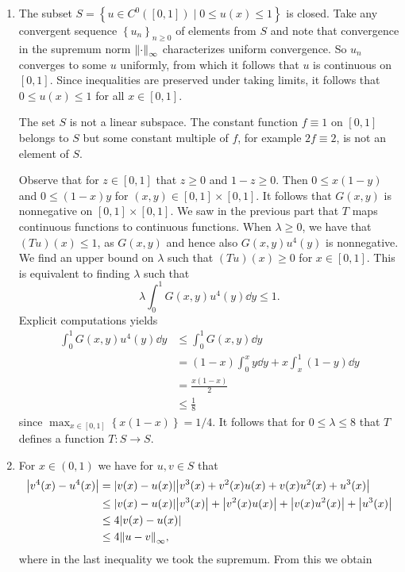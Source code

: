 \documentclass[11pt]{article}
\newcommand{\cbr}[1]{\left\{#1\right\}}
\begin{document}
\begin{enumerate}[label=\textbf{\arabic*.}]
\begin{enumerate}[label=\textsf{(\roman*)}]
        \item The subset $S = \cbr{u\in C^0([0,1])\mid 0\leq u(x)\leq 1}$ is closed. Take any convergent sequence $\cbr{u_n}_{n\geq 0}$ of elements from $S$ and note that convergence in the supremum norm $\norm{\cdot}_\infty$ characterizes uniform convergence. So $u_n$ converges to some $u$ uniformly, from which it follows that $u$ is continuous on $[0,1]$. Since inequalities are preserved under taking limits, it follows that $0\leq u(x)\leq 1$ for all $x\in [0,1]$.
        
        The set $S$ is not a linear subspace. The constant function $f \equiv 1$ on $[0,1]$ belongs to $S$ but some constant multiple of $f$, for example $2f\equiv 2$, is not an element of $S$.

        Observe that for $z\in [0,1]$ that $z\geq 0$ and $1-z\geq 0$. Then $0\leq x(1-y)$ and $0\leq (1-x)y$ for $(x,y)\in[0,1]\times [0,1]$. It follows that $G(x,y)$ is nonnegative on $[0,1]\times [0,1]$. We saw in the previous part that $T$ maps continuous functions to continuous functions. When $\lambda \geq 0$, we have that $(Tu)(x)\leq 1$, as $G(x,y)$ and hence also $G(x,y)u^4(y)$ is nonnegative. We find an upper bound on $\lambda$ such that $(Tu)(x)\geq 0$ for $x\in [0,1]$. This is equivalent to finding $\lambda$ such that 
        \[\lambda\int_0^1G(x,y)u^4(y)\dd y\leq 1.\] Explicit computations yields
        \begin{align*}
            \int_0^1 G(x,y)u^4(y)\dd y &\leq \int_0^1 G(x,y)\dd y \\
            &= (1-x)\int_0^x y\dd y + x\int_x^1 (1-y)\dd y \\
            &= \frac{x(1-x)}{2}\\
            &\leq \frac{1}{8}
        \end{align*}
        since $\max_{x\in [0,1]}\cbr{x(1-x)} = 1/4$. It follows that for $0\leq \lambda \leq 8$ that $T$ defines a function $T\colon S\to S$.
        \item For $x\in(0,1)$ we have for $u,v\in S$ that
        \begin{align*}
            \abs{v^4(x)-u^4(x)} &= \abs{v(x)-u(x)}\abs{v^3(x) + v^2(x)u(x) + v(x)u^2(x) + u^3(x)}\\
            &\leq \abs{v(x)-u(x)}\abs{v^3(x)} + \abs{v^2(x)u(x)} + \abs{v(x)u^2(x)} + \abs{u^3(x)}\\
            &\leq 4\abs{v(x)-u(x)}\\
            &\leq 4\norm{u-v}_\infty,
        \end{align*} where in the last inequality we took the supremum. From this we obtain \begin{align*}

\end{align*}
\end{enumerate}
\end{enumerate}
\end{document}
